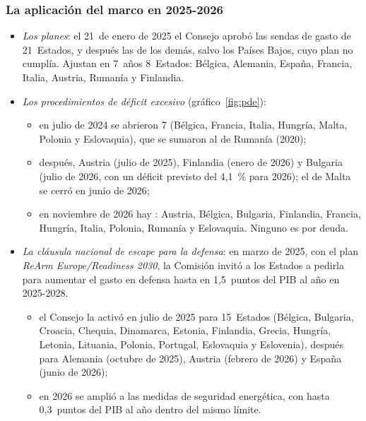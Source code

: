 \documentclass[11pt]{article}
\begin{document}
\subsubsection{La aplicación del marco en 2025-2026}\label{sec:aplicacion}

\begin{itemize}
\item \emph{Los planes}: el 21~de enero de 2025 el Consejo aprobó las sendas de gasto de 21~Estados, y después las de los demás, salvo los Países Bajos, cuyo plan no cumplía\nocite{Consejo2025Sendas21}. Ajustan en 7~años 8~Estados: Bélgica, Alemania, España, Francia, Italia, Austria, Rumanía y Finlandia\nocite{CE2026PaquetePrimavera}.
\item \emph{Los procedimientos de déficit excesivo} (gráfico~\ref{fig:pde}):
  \begin{itemize}
  \item en julio de 2024 se abrieron 7 (Bélgica, Francia, Italia, Hungría, Malta, Polonia y Eslovaquia), que se sumaron al de Rumanía (2020)\nocite{Consejo2024PDE7};
  \item después, Austria (julio de 2025), Finlandia (enero de 2026) y Bulgaria (julio de 2026, con un déficit previsto del 4,1~\% para 2026); el de Malta se cerró en junio de 2026\nocite{Consejo2026PDEBulgaria,Consejo2026PDEMalta};
  \item en noviembre de 2026 hay : Austria, Bélgica, Bulgaria, Finlandia, Francia, Hungría, Italia, Polonia, Rumanía y Eslovaquia\nocite{CE2026PDE}. Ninguno es por deuda.
  \end{itemize}
\item \emph{La cláusula nacional de escape para la defensa}: en marzo de 2025, con el plan \emph{ReArm Europe/Readiness 2030}, la Comisión invitó a los Estados a pedirla para aumentar el gasto en defensa hasta en 1,5~puntos del PIB al año en 2025-2028\nocite{CE2025Defensa}.
  \begin{itemize}
  \item el Consejo la activó en julio de 2025 para 15~Estados (Bélgica, Bulgaria, Croacia, Chequia, Dinamarca, Estonia, Finlandia, Grecia, Hungría, Letonia, Lituania, Polonia, Portugal, Eslovaquia y Eslovenia), después para Alemania (octubre de 2025), Austria (febrero de 2026) y España (junio de 2026)\nocite{Consejo2025Clausula15,Consejo2026ClausulaEspana};
  \item en 2026 se amplió a las medidas de seguridad energética, con hasta 0,3~puntos del PIB al año dentro del mismo límite\nocite{CE2026PaquetePrimavera}.
  \end{itemize}
\end{itemize}
\end{document}
